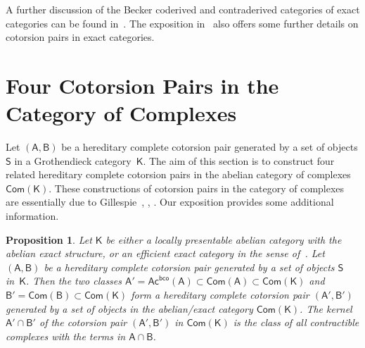 \documentclass[12pt,a4paper]{amsart}
\newcommand{\+}{\nobreakdash-}
\renewcommand{\:}{\colon}
\newcommand{\sA}{\mathsf A}
\newcommand{\sB}{\mathsf B}
\newcommand{\sK}{\mathsf K}
\newcommand{\sS}{\mathsf S}
\newcommand{\Com}{\mathsf{Com}}
\newcommand{\Ac}{\mathsf{Ac}}
\newcommand{\bco}{\mathsf{bco}}
\newcommand{\Section}[1]{\bigskip\section{#1}\medskip}
\theoremstyle{plain}
\newtheorem{prop}[thm]{Proposition}
\theoremstyle{definition}
\begin{document}
 A further discussion of the Becker coderived and contraderived
categories of exact categories can be found
in~\cite[Section~B.7]{Pcosh}.
 The exposition in~\cite[Appendix~B]{Pcosh} also offers some further
details on cotorsion pairs in exact categories.


\Section{Four Cotorsion Pairs in the Category of Complexes}

 Let $(\sA,\sB)$ be a hereditary complete cotorsion pair generated
by a set of objects $\sS$ in a Grothendieck category~$\sK$.
 The aim of this section is to construct four related hereditary
complete cotorsion pairs in the abelian category of complexes
$\Com(\sK)$.
 These constructions of cotorsion pairs in the category of complexes
are essentially due to Gillespie~\cite[Proposition~3.6]{Gil},
\cite[Proposition~3.2]{Gil2}, \cite[Lemma~4.9]{Gil3}.
 Our exposition provides some additional information.

\begin{prop} \label{coacyclic-all-cotorsion-pair-prop}
 Let\/ $\sK$ be either a locally presentable abelian category with
the abelian exact structure, or an efficient exact category in
the sense of\/~\cite{Sto-ICRA}.
 Let $(\sA,\sB)$ be a hereditary complete cotorsion pair generated
by a set of objects\/ $\sS$ in\/~$\sK$.
 Then the two classes\/ $\sA'=\Ac^\bco(\sA)\subset\Com(\sA)\subset
\Com(\sK)$ and\/ $\sB'=\Com(\sB)\subset\Com(\sK)$ form a hereditary
complete cotorsion pair $(\sA',\sB')$ generated by a set of objects in
the abelian/exact category\/ $\Com(\sK)$.
 The kernel\/ $\sA'\cap\sB'$ of the cotorsion pair $(\sA',\sB')$ in\/
$\Com(\sK)$ is the class of all contractible complexes with the terms
in\/ $\sA\cap\sB$.
\end{prop}
\end{document}
